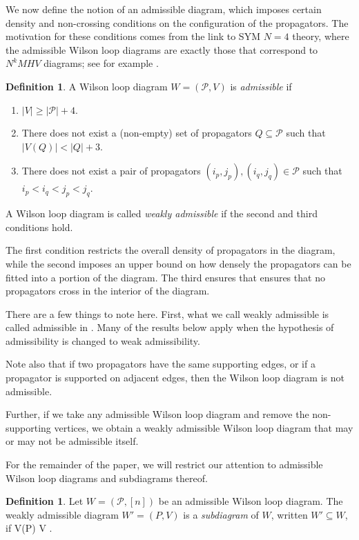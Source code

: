\documentclass[11pt]{article}
\def\bas #1\eas{\begin{align*} #1 \end{align*}}
\newcommand{\cP}{\mathcal{P}}
\theoremstyle{remark}
\theoremstyle{definition}
\newtheorem{dfn}[thm]{Definition}
\begin{document}
We now define the notion of an admissible diagram, which imposes certain density and non-crossing conditions on the configuration of the propagators. The motivation for these conditions comes from the link to SYM $N=4$ theory, where the admissible Wilson loop diagrams are exactly those that correspond to $N^kMHV$ diagrams; see for example \cite{Amplituhedronsquared}.

\begin{dfn}\label{admisdfn}
A Wilson loop diagram $W = (\cP,V)$ is {\em admissible} if \begin{enumerate}
\item $|V| \geq |\cP| + 4.$
\item There does not exist a (non-empty) set of propagators $Q \subseteq \cP$ such that $|V(Q)| < |Q| + 3$.
\item There does not exist a pair of propagators $(i_p,j_p),(i_q,j_q) \in \cP$ such that $i_p < i_q < j_p <j_q$.
\end{enumerate}
A Wilson loop diagram is called {\em weakly admissible} if the second and third conditions hold.
 \end{dfn}

The first condition restricts the overall density of propagators in the diagram, while the second imposes an upper bound on how densely the propagators can be fitted into a portion of the diagram. The third ensures that ensures that no propagators cross in the interior of the diagram. 

There are a few things to note here.  First, what we call weakly admissible is called admissible in \cite{wilsonloop}.  Many of the results below apply when the hypothesis of admissibility is changed to weak admissibility.

Note also that if two propagators have the same supporting edges, or if a propagator is supported on adjacent edges, then the Wilson loop diagram is not admissible.

Further, if we take any admissible Wilson loop diagram and remove the non-supporting vertices, we obtain a weakly admissible Wilson loop diagram that may or may not be admissible itself.

For the remainder of the paper, we will restrict our attention to admissible Wilson loop diagrams and subdiagrams thereof.

\begin{dfn} \label{subdiagramdfn}
Let $W = (\cP, [n])$ be an admissible Wilson loop diagram. The weakly admissible diagram $W' = (P,V)$ is a {\em subdiagram} of $W$, written $W' \subseteq W$, if \bas P \subseteq \cP {} \quad V(P) \subseteq V \subseteq [n]\;.\eas
\end{dfn}
\end{document}
